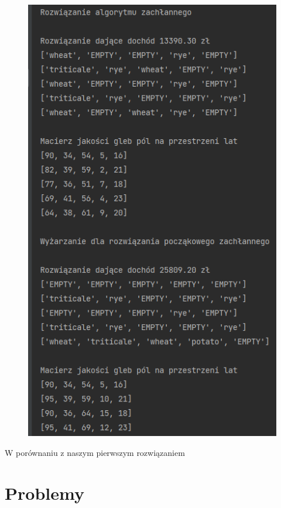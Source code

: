 \documentclass[12pt,a4paper]{article}
\begin{document}
\begin{figure}[H]
	\centering
	\includegraphics[width=1\linewidth]{screens/mamos_rozw}
	\caption{}
	\label{fig:mamosrozw}
\end{figure}

W porównaniu z naszym pierwszym rozwiązaniem 

\section{Problemy}
\end{document}
